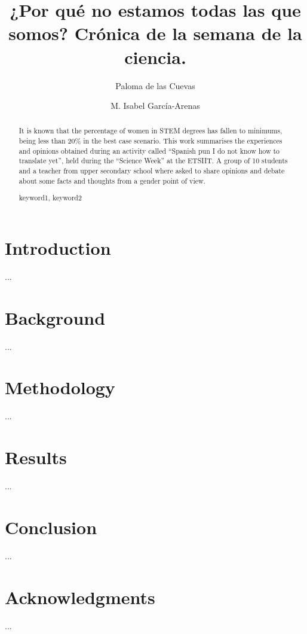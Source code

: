 \documentclass[runningheads,a4paper]{llncs}
\newcommand{\keywords}[1]{\par\addvspace\baselineskip
\noindent\keywordname\enspace\ignorespaces#1}
\begin{document}
\mainmatter

\title{¿Por qu\'{e} no estamos todas las que somos? Cr\'{o}nica de la semana de la ciencia.}

\author{Paloma de las Cuevas \and M. Isabel Garc\'{i}a-Arenas}


\maketitle


\begin{abstract}

It is known that the percentage of women in STEM degrees has fallen to minimums, being less than 20\% in the best case scenario. This work summarises the experiences and opinions obtained during an activity called ``Spanish pun I do not know how to translate yet'', held during the ``Science Week'' at the ETSIIT. A group of 10 students and a teacher from upper secondary school where asked to share opinions and debate about some facts and thoughts from a gender point of view.

\keywords{keyword1, keyword2}
\end{abstract}

\section{Introduction}
\label{sec:intro}

...

\section{Background}
\label{sec:background}

...

\section{Methodology}
\label{methodology}

...

\section{Results}
\label{sec:results}

...

\section{Conclusion}
\label{conclusion}

...

\section*{Acknowledgments}

...



\end{document}
